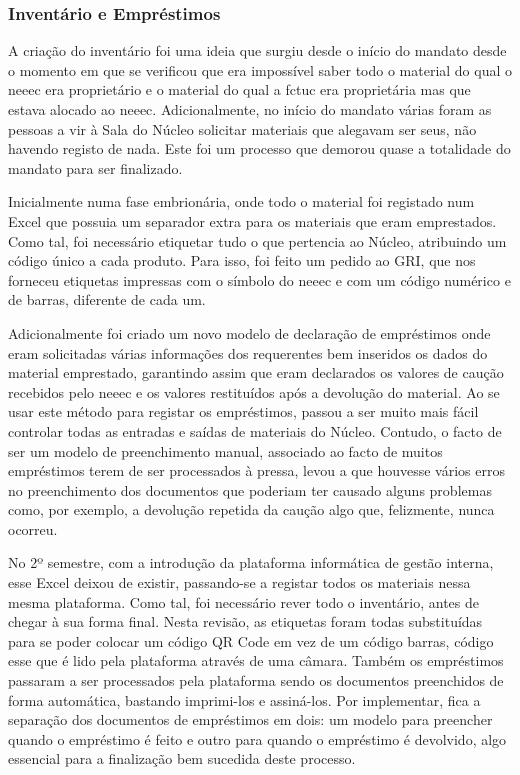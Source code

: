 
\subsubsection{Inventário e Empréstimos}

A criação do inventário foi uma ideia que surgiu desde o início do mandato desde o momento em que se verificou que era impossível saber todo o material do qual o \acrshort{neeec} era proprietário e o material do qual a \acrshort{fctuc} era proprietária mas que estava alocado ao \acrshort{neeec}. Adicionalmente, no início do mandato várias foram as pessoas a vir à Sala do Núcleo solicitar materiais que alegavam ser seus, não havendo registo de nada. Este foi um processo que demorou quase a totalidade do mandato para ser finalizado.

Inicialmente numa fase embrionária, onde todo o material foi registado num Excel que possuia um separador extra para os materiais que eram emprestados. Como tal, foi necessário etiquetar tudo o que pertencia ao Núcleo, atribuindo um código único a cada produto. Para isso, foi feito um pedido ao GRI, que nos forneceu etiquetas impressas com o símbolo do \acrshort{neeec} e com um código numérico e de barras, diferente de cada um.

Adicionalmente foi criado um novo modelo de declaração de empréstimos onde eram solicitadas várias informações dos requerentes bem inseridos os dados do material emprestado, garantindo assim que eram declarados os valores de caução recebidos pelo \acrshort{neeec} e os valores restituídos após a devolução do material. Ao se usar este método para registar os empréstimos, passou a ser muito mais fácil controlar todas as entradas e saídas de materiais do Núcleo. Contudo, o facto de ser um modelo de preenchimento manual, associado ao facto de muitos empréstimos terem de ser processados à pressa, levou a que houvesse vários erros no preenchimento dos documentos que poderiam ter causado alguns problemas como, por exemplo, a devolução repetida da caução algo que, felizmente, nunca ocorreu.

No 2º semestre, com a introdução da plataforma informática de gestão interna, esse Excel deixou de existir, passando-se a registar todos os materiais nessa mesma plataforma. Como tal, foi necessário rever todo o inventário, antes de chegar à sua forma final. Nesta revisão, as etiquetas foram todas substituídas para se poder colocar um código QR Code em vez de um código barras, código esse que é lido pela plataforma através de uma câmara. Também os empréstimos passaram a ser processados pela plataforma sendo os documentos preenchidos de forma automática, bastando imprimi-los e assiná-los. Por implementar, fica a separação dos documentos de empréstimos em dois: um modelo para preencher quando o empréstimo é feito e outro para quando o empréstimo é devolvido, algo essencial para a finalização bem sucedida deste processo.

